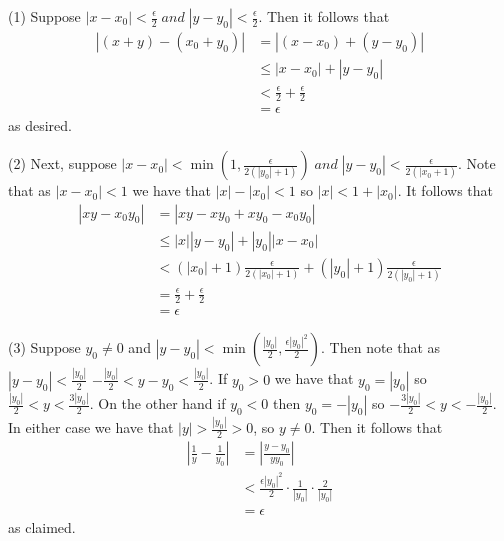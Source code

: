 \documentclass[12pt]{report}
\begin{document}
\begin{proof*}{}{}
    (1) Suppose $|x-x_0| < \frac{\epsilon}{2}\;and\;|y-y_0| < \frac{\epsilon}{2}$. Then it follows that \begin{align*}
        |(x+y) - (x_0+y_0)| &= |(x-x_0)+(y-y_0)| \\
        &\leq |x-x_0| + |y-y_0| \\
        &< \frac{\epsilon}{2} + \frac{\epsilon}{2} \\
        &= \epsilon
    \end{align*}
    as desired.


    (2) Next, suppose $|x-x_0| < \min\left(1,\frac{\epsilon}{2(|y_0|+1)}\right)\;and\;|y-y_0| < \frac{\epsilon}{2(|x_0+1)}$. Note that as $|x-x_0| < 1$ we have that $|x| - |x_0| < 1$ so $|x| < 1+|x_0|$. It follows that \begin{align*}
        |xy-x_0y_0| &= |xy-xy_0+xy_0-x_0y_0| \\
        &\leq |x||y-y_0| + |y_0||x-x_0| \\
        &< (|x_0|+1)\frac{\epsilon}{2(|x_0|+1)} + (|y_0| + 1)\frac{\epsilon}{2(|y_0|+1)} \\
        &= \frac{\epsilon}{2} + \frac{\epsilon}{2} \\
        &= \epsilon
    \end{align*}


    (3) Suppose $y_0 \neq 0$ and $|y-y_0| < \min\left(\frac{|y_0|}{2},\frac{\epsilon|y_0|^2}{2}\right)$. Then note that as $|y-y_0| < \frac{|y_0|}{2}$ $-\frac{|y_0|}{2} < y-y_0 < \frac{|y_0|}{2}$. If $y_0 > 0$ we have that $y_0 = |y_0|$ so $\frac{|y_0|}{2} < y < \frac{3|y_0|}{2}$. On the other hand if $y_0 < 0$ then $y_0 = -|y_0|$ so $-\frac{3|y_0|}{2} < y < -\frac{|y_0|}{2}$. In either case we have that $|y| > \frac{|y_0|}{2} > 0$, so $y \neq 0$. Then it follows that \begin{align*}
        \left|\frac{1}{y} - \frac{1}{y_0}\right| &= \left|\frac{y - y_0}{yy_0}\right| \\
        &< \frac{\epsilon|y_0|^2}{2}\cdot \frac{1}{|y_0|}\cdot \frac{2}{|y_0|} \\
        &= \epsilon
    \end{align*}
    as claimed.
\end{proof*}
\end{document}
